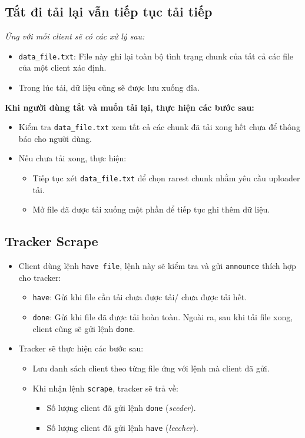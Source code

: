 \documentclass[a4paper]{article}
\begin{document}
\subsection{Tắt đi tải lại vẫn tiếp tục tải tiếp}
\textit{Ứng với mỗi client sẽ có các xử lý sau:}
\begin{itemize}
    \item \texttt{data\_file.txt}: File này ghi lại toàn bộ tình trạng chunk của tất cả các file của một client xác định.
    \item Trong lúc tải, dữ liệu cũng sẽ được lưu xuống đĩa.
\end{itemize}

\textbf{Khi người dùng tắt và muốn tải lại, thực hiện các bước sau:}
\begin{itemize}
    \item Kiểm tra \texttt{data\_file.txt} xem tất cả các chunk đã tải xong hết chưa để thông báo cho người dùng.
    \item Nếu chưa tải xong, thực hiện:
    \begin{itemize}
        \item Tiếp tục xét \texttt{data\_file.txt} để chọn rarest chunk nhằm yêu cầu uploader tải.
        \item Mở file đã được tải xuống một phần để tiếp tục ghi thêm dữ liệu.
    \end{itemize}
\end{itemize}

\subsection{Tracker Scrape}
\begin{itemize}
    \item Client dùng lệnh \texttt{have file}, lệnh này sẽ kiểm tra và gửi \texttt{announce} thích hợp cho tracker:
    \begin{itemize}
        \item \texttt{have}: Gửi khi file cần tải chưa được tải/ chưa được tải hết.
        \item \texttt{done}: Gửi khi file đã được tải hoàn toàn. Ngoài ra, sau khi tải file xong, client cũng sẽ gửi lệnh \texttt{done}.
    \end{itemize}
    \item Tracker sẽ thực hiện các bước sau:
    \begin{itemize}
        \item Lưu danh sách client theo từng file ứng với lệnh mà client đã gửi.
        \item Khi nhận lệnh \texttt{scrape}, tracker sẽ trả về:
        \begin{itemize}
            \item Số lượng client đã gửi lệnh \texttt{done} (\textit{seeder}).
            \item Số lượng client đã gửi lệnh \texttt{have} (\textit{leecher}).
        \end{itemize}
    \end{itemize}
\end{itemize}
\end{document}
